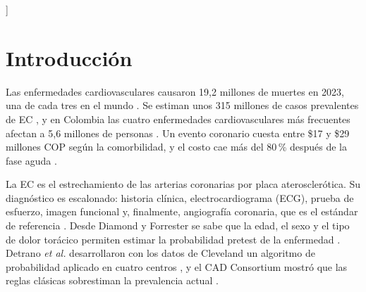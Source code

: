 \documentclass[twocolumn,10pt]{article}
\begin{document}
\begin{@twocolumnfalse}
\renewcommand{\abstractname}{ABSTRACT}
\begin{abstract}
\vspace*{0.2cm}
\justify
\fontsize{9.5pt}{11pt}\selectfont
Coronary artery disease (CAD) is the leading cause of death worldwide and its confirmation requires invasive angiography. Using the official UCI \textit{Heart Disease} Cleveland dataset (297 complete cases, 137 events), we estimated crude and adjusted odds ratios and compared a basic logistic regression (11 non-invasive variables), an extended model (adding fluoroscopy and thallium scintigraphy), a CART tree and a Random Forest through repeated stratified $5\times20$ cross-validation, optimism bootstrap, DeLong confidence intervals and calibration. Asymptomatic chest pain (OR 10.60), male sex (OR 7.48) and exercise ST depression (OR 1.82 per mm) were independent predictors. The basic model reached an AUC of 0.874 (0.880 optimism-corrected) with good calibration; imaging added 0.035. Logistic regression outperformed the tree and matched the Random Forest. The widely used Kaggle version of the dataset has an inverted diagnostic label.

\end{abstract}
\vspace*{0.4cm}
\end{@twocolumnfalse}
]

\section{Introducci\'on}
\justifying
Las enfermedades cardiovasculares causaron 19,2 millones de muertes en 2023, una de cada tres en el mundo \cite{ihme2025}. Se estiman unos 315 millones de casos prevalentes de EC \cite{stark2024}, y en Colombia las cuatro enfermedades cardiovasculares m\'as frecuentes afectan a 5,6 millones de personas \cite{deloitte2015}. Un evento coronario cuesta entre \$17 y \$29 millones COP seg\'un la comorbilidad, y el costo cae m\'as del 80\,\% despu\'es de la fase aguda \cite{rcc2018}.

La EC es el estrechamiento de las arterias coronarias por placa ateroscler\'otica. Su diagn\'ostico es escalonado: historia cl\'inica, electrocardiograma (ECG), prueba de esfuerzo, imagen funcional y, finalmente, angiograf\'ia coronaria, que es el est\'andar de referencia \cite{vrints2024}. Desde Diamond y Forrester se sabe que la edad, el sexo y el tipo de dolor tor\'acico permiten estimar la probabilidad pretest de la enfermedad \cite{diamond1979}. Detrano \textit{et al.} desarrollaron con los datos de Cleveland un algoritmo de probabilidad aplicado en cuatro centros \cite{detrano1989}, y el CAD Consortium mostr\'o que las reglas cl\'asicas sobrestiman la prevalencia actual \cite{genders2011}.
\end{document}
